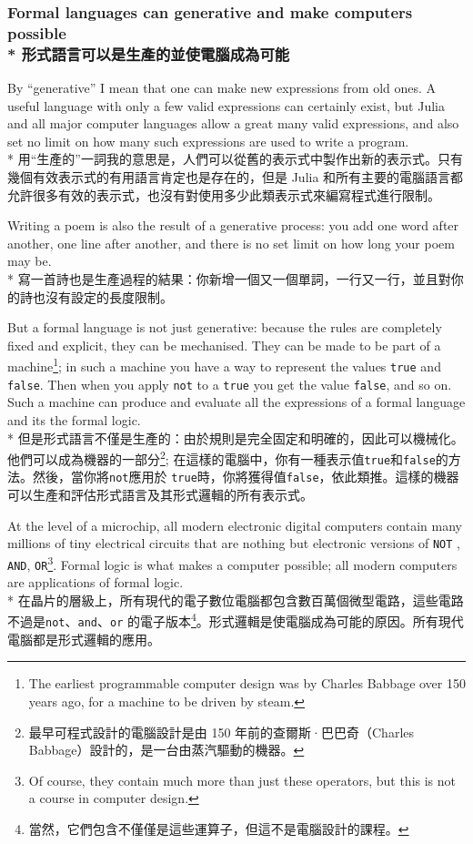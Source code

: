 \documentclass[]{article}
\begin{document}
\subsubsection*{{\color{gray}Formal languages can generative and make computers possible}
\\*
{形式語言可以是生產的並使電腦成為可能}}

{\color{gray}By ``generative'' I mean that one can make new expressions from old ones. A useful language with only a few valid expressions can certainly exist, but Julia and all major computer languages allow a great many valid expressions, and also set no limit on how many such expressions are used to write a program.}
\\*
{用``生產的''一詞我的意思是，人們可以從舊的表示式中製作出新的表示式。只有幾個有效表示式的有用語言肯定也是存在的，但是 Julia 和所有主要的電腦語言都允許很多有效的表示式，也沒有對使用多少此類表示式來編寫程式進行限制。}

{\color{gray}Writing a poem is also the result of a generative process: you add one word after another, one line after another, and there is no set limit on how long your poem may be.}
\\*
{寫一首詩也是生產過程的結果：你新增一個又一個單詞，一行又一行，並且對你的詩也沒有設定的長度限制。}

{\color{gray}But a formal language is not just generative: because the rules are  completely fixed and explicit, they can be mechanised. They can be made to be part of a machine\footnote{The earliest programmable computer design was by Charles Babbage over 150 years ago, for a machine to be driven by steam.}; in such a machine you have a way to represent the values {\tt true} and {\tt false}. Then when you apply {\tt not} to a {\tt true} you get the value {\tt false}, and so on. Such a machine can produce and evaluate all the expressions of a formal language and its the formal logic.}
\\*
{但是形式語言不僅是生產的：由於規則是完全固定和明確的，因此可以機械化。他們可以成為機器的一部分\footnote{最早可程式設計的電腦設計是由 150 年前的查爾斯·巴巴奇（Charles Babbage）設計的，是一台由蒸汽驅動的機器。}; 在這樣的電腦中，你有一種表示值{\tt true}和{\tt false}的方法。然後，當你將{\tt not}應用於 {\tt true}時，你將獲得值{\tt false}，依此類推。這樣的機器可以生產和評估形式語言及其形式邏輯的所有表示式。}

{\color{gray}At the level of a microchip, all modern electronic digital computers contain many millions of tiny electrical circuits that are nothing but electronic versions of {\tt NOT} , {\tt AND}, {\tt OR}\footnote{Of course, they contain much more than just these operators, but this is not a course in computer design.}. Formal logic is what makes a computer possible; all modern computers are applications of formal logic.
}
\\*
{在晶片的層級上，所有現代的電子數位電腦都包含數百萬個微型電路，這些電路不過是{\tt not}、{\tt and}、{\tt or} 的電子版本\footnote{當然，它們包含不僅僅是這些運算子，但這不是電腦設計的課程。}。形式邏輯是使電腦成為可能的原因。所有現代電腦都是形式邏輯的應用。}
\end{document}
